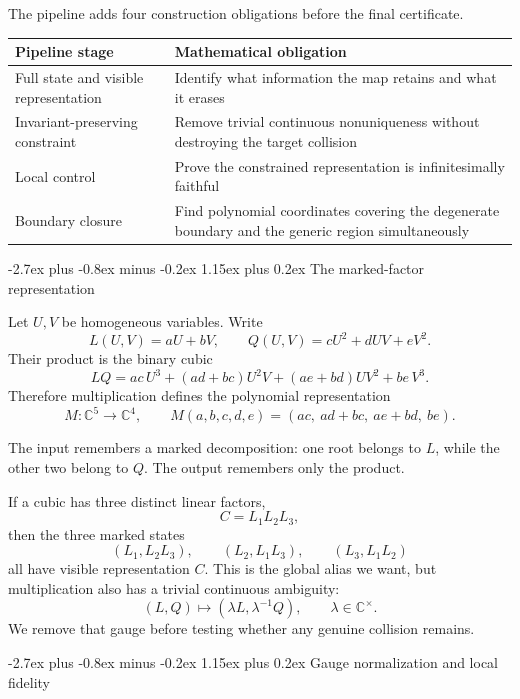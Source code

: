\documentclass[11pt,letterpaper]{article}
\makeatletter
\newcommand{\C}{\mathbb{C}}
\theoremstyle{jgpplain}
\renewcommand{\section}{\@startsection{section}{1}{0pt}%
  {-2.7ex plus -0.8ex minus -0.2ex}%
  {1.15ex plus 0.2ex}%
  {\normalfont\sffamily\Large\bfseries\color{JGPBlue}}}
\makeatother
\begin{document}
The pipeline adds four construction obligations before the final certificate.

\begin{center}
\renewcommand{\arraystretch}{1.22}
\begin{tabular}{>{\raggedright\arraybackslash}p{}
                >{\raggedright\arraybackslash}p{}}
\toprule
\sffamily\bfseries Pipeline stage &
\sffamily\bfseries Mathematical obligation\\
\midrule
Full state and visible representation &
Identify what information the map retains and what it erases\\
Invariant-preserving constraint &
Remove trivial continuous nonuniqueness without destroying the target collision\\
Local control &
Prove the constrained representation is infinitesimally faithful\\
Boundary closure &
Find polynomial coordinates covering the degenerate boundary and the generic
region simultaneously\\
\bottomrule
\end{tabular}
\end{center}

\section{The marked-factor representation}

Let \(U,V\) be homogeneous variables. Write
\[
L(U,V)=aU+bV,
\qquad
Q(U,V)=cU^2+dUV+eV^2.
\]
Their product is the binary cubic
\[
LQ
=ac\,U^3+(ad+bc)U^2V+(ae+bd)UV^2+be\,V^3.
\]
Therefore multiplication defines the polynomial representation
\[
M:\C^5\longrightarrow\C^4,
\qquad
M(a,b,c,d,e)=(ac,\ ad+bc,\ ae+bd,\ be).
\]

The input remembers a marked decomposition: one root belongs to \(L\), while
the other two belong to \(Q\). The output remembers only the product.

If a cubic has three distinct linear factors,
\[
C=L_1L_2L_3,
\]
then the three marked states
\[
(L_1,L_2L_3),\qquad
(L_2,L_1L_3),\qquad
(L_3,L_1L_2)
\]
all have visible representation \(C\). This is the global alias we want, but
multiplication also has a trivial continuous ambiguity:
\[
(L,Q)\longmapsto(\lambda L,\lambda^{-1}Q),
\qquad \lambda\in\C^\times.
\]
We remove that gauge before testing whether any genuine collision remains.

\section{Gauge normalization and local fidelity}
\end{document}
